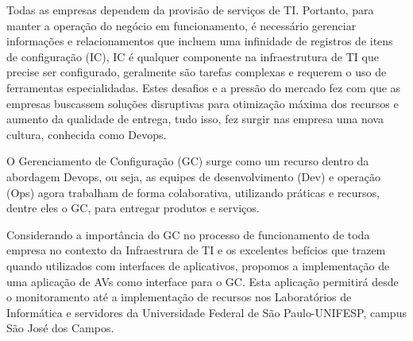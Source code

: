\documentclass[quali]{mpit}
\begin{document}
Todas as empresas dependem da provisão de serviços de TI. Portanto, para manter a operação do negócio em funcionamento, é necessário gerenciar informações e relacionamentos que incluem uma infinidade de registros de itens de configuração (IC), IC é qualquer componente na infraestrutura de TI que precise ser configurado, geralmente são tarefas complexas e requerem o uso de ferramentas especialidadas. Estes desafios e a pressão do mercado fez com que as empresas buscassem soluções disruptivas para otimização máxima dos recursos e aumento da qualidade de entrega, tudo isso, fez surgir nas empresa uma nova cultura, conhecida como Devops.

O Gerenciamento de Configuração (GC) surge como um recurso dentro  da abordagem Devops, ou seja, as equipes de desenvolvimento (Dev) e operação (Ops) agora trabalham de forma colaborativa, utilizando práticas e recursos, dentre eles o GC, para entregar produtos e serviços. 

Considerando a importância do GC no processo de funcionamento de toda empresa no contexto da Infraestrura de TI e os excelentes befícios que trazem quando utilizados com interfaces de aplicativos, propomos a implementação de uma aplicação de AVs como interface para o GC. Esta aplicação permitirá desde o monitoramento até a implementação de recursos nos Laboratórios de Informática e servidores da Universidade Federal de São Paulo-UNIFESP, campus São José dos Campos. 
\end{document}
